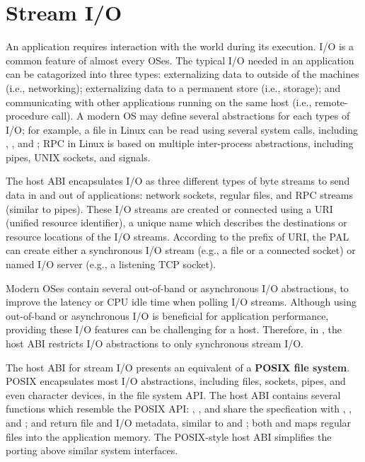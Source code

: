 \section{Stream I/O}
\label{sec:abi:streams}


An application requires interaction with the world during its execution.
I/O is a common feature of almost every OSes.
The typical I/O needed in an application
can be catagorized into three types:
externalizing data to outside of the machines (i.e., networking);
externalizing data to a permanent store (i.e., storage);
and communicating with other applications running on the same host (i.e., remote-procedure call).
A modern OS may define several abstractions
for each types of I/O; for example, a file in Linux can be read using several system calls,
including , , and ;
RPC in Linux is based on multiple inter-process abstractions,
including pipes, UNIX sockets, and signals.




The host ABI
encapsulates I/O as three different types of byte streams
to send data in and out of applications:
network sockets, regular files, and RPC streams (similar to pipes).
These I/O streams
are created or connected using a URI (unified resource identifier),
a unique name which describes the destinations or resource locations of the I/O streams.
According to the prefix of URI,
the PAL can create either a synchronous I/O stream (e.g., a file or a connected socket)
or named I/O server (e.g., a listening TCP socket).


Modern OSes contain several out-of-band or asynchronous I/O abstractions, to improve the latency or CPU idle time
when polling I/O streams.
Although using out-of-band or asynchronous I/O is beneficial for application performance,
providing these I/O features can be challenging for a host.
Therefore, in \graphene{}, the host ABI restricts I/O abstractions to only synchronous stream I/O.



The host ABI for stream I/O presents an equivalent of a {\bf POSIX file system}.
POSIX
encapsulates most I/O abstractions,
including files, sockets, pipes, and even character devices,
in the file system API.
The host ABI contains several functions
which resemble the POSIX API:
, , and 
share the specfication with , , and ;
 and  return file and I/O metadata, similar to  and ;
both  and  maps regular files into the application memory. %
The POSIX-style host ABI
simplifies the porting above
similar system interfaces.






